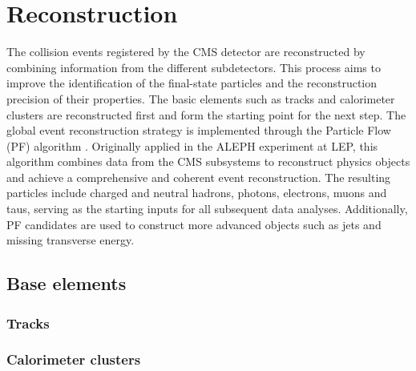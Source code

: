 \chapter{Reconstruction}

The collision events registered by the CMS detector are reconstructed by combining information from the different subdetectors.
This process aims to improve the identification of the final-state particles and the reconstruction precision of their properties.
The basic elements such as tracks and calorimeter clusters are reconstructed first and form the starting point for the next step.
The global event reconstruction strategy is implemented through the Particle Flow (PF) algorithm \cite{ParticleFlow}.
Originally applied in the ALEPH experiment at LEP, this algorithm combines data from the CMS subsystems to reconstruct physics objects and achieve a comprehensive and coherent event reconstruction.
The resulting particles include charged and neutral hadrons, photons, electrons, muons and taus, serving as the starting inputs for all subsequent data analyses.
Additionally, PF candidates are used to construct more advanced objects such as jets and missing transverse energy.



\section{Base elements}
\subsection{Tracks}
\label{sec:tracks}


\subsection{Calorimeter clusters}


